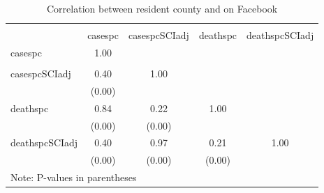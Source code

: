 \begin{table}[htbp]\centering
\caption{Correlation between resident county and on Facebook}
\begin{tabular}{l*{4}{c}}
\hline\hline
            &\multicolumn{4}{c}{}                               \\
            &     casespc&casespcSCIadj&    deathspc&deathspcSCIadj\\
\hline
casespc     &        1.00&            &            &            \\
            &            &            &            &            \\
[1em]
casespcSCIadj&        0.40&        1.00&            &            \\
            &      (0.00)&            &            &            \\
[1em]
deathspc    &        0.84&        0.22&        1.00&            \\
            &      (0.00)&      (0.00)&            &            \\
[1em]
deathspcSCIadj&        0.40&        0.97&        0.21&        1.00\\
            &      (0.00)&      (0.00)&      (0.00)&            \\
\hline\hline
\multicolumn{5}{l}{\footnotesize Note: P-values in parentheses}\\
\end{tabular}
\end{table}
